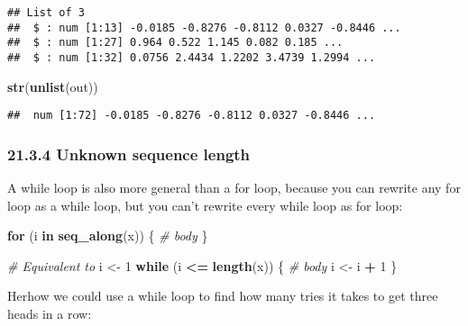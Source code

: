 \documentclass[
]{article}
\newenvironment{Shaded}{\begin{snugshade}}{\end{snugshade}}
\newcommand{\CommentTok}[1]{\textcolor[rgb]{0.56,0.35,0.01}{\textit{#1}}}
\newcommand{\ControlFlowTok}[1]{\textcolor[rgb]{0.13,0.29,0.53}{\textbf{#1}}}
\newcommand{\DecValTok}[1]{\textcolor[rgb]{0.00,0.00,0.81}{#1}}
\newcommand{\FunctionTok}[1]{\textcolor[rgb]{0.13,0.29,0.53}{\textbf{#1}}}
\newcommand{\NormalTok}[1]{#1}
\newcommand{\OtherTok}[1]{\textcolor[rgb]{0.56,0.35,0.01}{#1}}
\newcommand{\SpecialCharTok}[1]{\textcolor[rgb]{0.81,0.36,0.00}{\textbf{#1}}}
\begin{document}
\begin{verbatim}
## List of 3
##  $ : num [1:13] -0.0185 -0.8276 -0.8112 0.0327 -0.8446 ...
##  $ : num [1:27] 0.964 0.522 1.145 0.082 0.185 ...
##  $ : num [1:32] 0.0756 2.4434 1.2202 3.4739 1.2994 ...
\end{verbatim}

\begin{Shaded}
\begin{Highlighting}[]
\FunctionTok{str}\NormalTok{(}\FunctionTok{unlist}\NormalTok{(out))}
\end{Highlighting}
\end{Shaded}

\begin{verbatim}
##  num [1:72] -0.0185 -0.8276 -0.8112 0.0327 -0.8446 ...
\end{verbatim}

\hypertarget{unknown-sequence-length}{%
\subsubsection{21.3.4 Unknown sequence
length}\label{unknown-sequence-length}}

A while loop is also more general than a for loop, because you can
rewrite any for loop as a while loop, but you can't rewrite every while
loop as for loop:

\begin{Shaded}
\begin{Highlighting}[]
\ControlFlowTok{for}\NormalTok{ (i }\ControlFlowTok{in} \FunctionTok{seq\_along}\NormalTok{(x)) \{}
  \CommentTok{\# body}
\NormalTok{\}}

\CommentTok{\# Equivalent to}
\NormalTok{i }\OtherTok{\textless{}{-}} \DecValTok{1}
\ControlFlowTok{while}\NormalTok{ (i }\SpecialCharTok{\textless{}=} \FunctionTok{length}\NormalTok{(x)) \{}
  \CommentTok{\# body}
\NormalTok{  i }\OtherTok{\textless{}{-}}\NormalTok{ i }\SpecialCharTok{+} \DecValTok{1} 
\NormalTok{\}}
\end{Highlighting}
\end{Shaded}

Herhow we could use a while loop to find how many tries it takes to get
three heads in a row:
\end{document}
